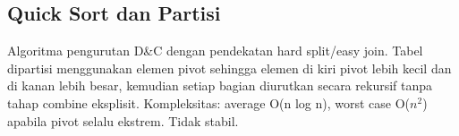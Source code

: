 \subsection{Quick Sort dan Partisi}
Algoritma pengurutan D\&C dengan pendekatan hard split/easy join. Tabel dipartisi menggunakan elemen pivot sehingga elemen di kiri pivot lebih kecil dan di kanan lebih besar, kemudian setiap bagian diurutkan secara rekursif tanpa tahap combine eksplisit. Kompleksitas: average O(n log n), worst case O($n^2$) apabila pivot selalu ekstrem. Tidak stabil.